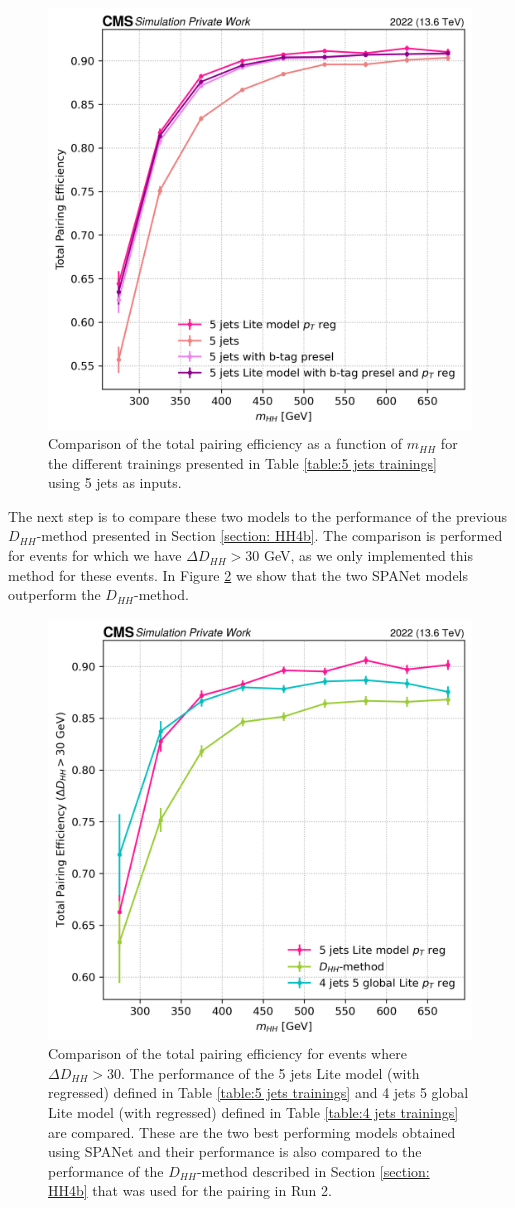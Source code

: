 \begin{figure}[h!]
    \centering
    \includegraphics[width=0.6\linewidth]{Images/6.Improving/Imput Comparisons/5j training comp.png}
    \caption{Comparison of the total pairing efficiency as a function of $m_{HH}$ for the different trainings presented in Table \ref{table:5 jets trainings} using 5 jets as inputs.}
    \label{fig: comp 5j}
\end{figure}



The next step is to compare these two models to the performance of the previous $D_{HH}$-method presented in Section \ref{section: HH4b}. The comparison is performed for events for which we have $\Delta D_{HH} > 30$ GeV, as we only implemented this method for these events. In Figure \ref{fig: 2 best models comp} we show that the two SPANet models outperform the $D_{HH}$-method. 

\begin{figure}[h!]
    \centering
    \includegraphics[width=0.6\linewidth]{Images/6.Improving/Imput Comparisons/2 best models comp run2 .png}
    \caption{Comparison of the total pairing efficiency for events where $\Delta D_{HH} > 30$. The performance of the 5 jets Lite model (with \pt regressed) defined in Table \ref{table:5 jets trainings} and 4 jets 5 global Lite model (with \pt regressed) defined in  Table \ref{table:4 jets trainings} are compared. These are the two best performing models obtained using SPANet and their performance is also compared to the performance of the $D_{HH}$-method described in Section \ref{section: HH4b} that was used for the pairing in Run 2. }
    \label{fig: 2 best models comp}
\end{figure}


